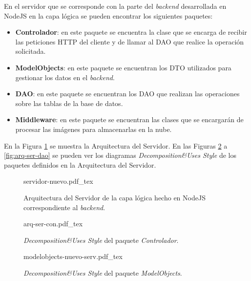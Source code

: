 En el servidor que se corresponde con la parte del \textit{backend} desarrollada en NodeJS en la capa lógica se pueden encontrar los siguientes paquetes:
\begin{itemize}
    \item \textbf{Controlador}: en este paquete se encuentra la clase que se encarga de recibir las peticiones HTTP del cliente y de llamar al DAO que realice la operación solicitada.
    \item \textbf{ModelObjects}: en este paquete se encuentran los DTO utilizados para gestionar los datos en el \textit{backend}.
    \item \textbf{DAO}: en este paquete se encuentran los DAO que realizan las operaciones sobre las tablas de la base de datos. 
    \item \textbf{Middleware}: en este paquete se encuentran las clases que se encargarán de procesar las imágenes para almacenarlas en la nube.
\end{itemize}

En la Figura \ref{fig:arquitectura-servidor} se muestra la Arquitectura del Servidor.
En las Figuras \ref{fig:arq-ser-con} a \ref{fig:arq-ser-dao}  se pueden ver los diagramas \textit{Decomposition\&Uses Style} de los paquetes definidos en la Arquitectura del Servidor.

\begin{figure}[H]
    \centering
    \begin{normalsize}
        {servidor-nuevo.pdf_tex}
    \end{normalsize}
    \caption{Arquitectura del Servidor de la capa lógica hecho en NodeJS correspondiente al \textit{backend}.}
     \label{fig:arquitectura-servidor}
 
 \end{figure}

 \begin{figure}[H]
    \centering
    \begin{normalsize}
        {arq-ser-con.pdf_tex}
    \end{normalsize}
    \caption{\textit{Decomposition\&Uses Style} del paquete \textit{Controlador}.}
     \label{fig:arq-ser-con}
 
 \end{figure}

 \begin{figure}
    \centering
    \begin{normalsize}
        {modelobjects-nuevo-serv.pdf_tex}
    \end{normalsize}
    \caption{\textit{Decomposition\&Uses Style} del paquete \textit{ModelObjects}.}
     \label{fig:arq-ser-dto}
 
 \end{figure}

